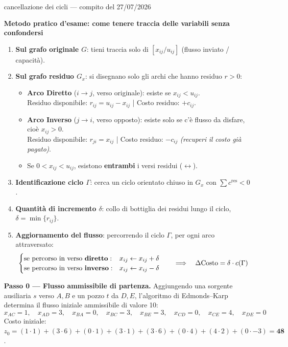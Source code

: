 \documentclass[11pt,a4paper]{article}
\begin{document}
\begin{es}{cancellazione dei cicli --- compito del 27/07/2026}
\begin{tcolorbox}[colback=lightbg,colframe=navy,arc=2pt,boxrule=0.8pt,left=6pt,right=6pt,top=5pt,bottom=5pt]
\textbf{Metodo pratico d'esame: come tenere traccia delle variabili senza confondersi}
\begin{enumerate}[leftmargin=1.2em,itemsep=0.2em]
\item \textbf{Sul grafo originale $G$}: tieni traccia solo di $[x_{ij} / u_{ij}]$ (flusso inviato / capacità).
\item \textbf{Sul grafo residuo $G_x$}: si disegnano solo gli archi che hanno residuo $r > 0$:
  \begin{itemize}[leftmargin=1.1em,itemsep=0.1em]
    \item \textbf{Arco Diretto} ($i \to j$, verso originale): esiste se $x_{ij} < u_{ij}$.\\
          Residuo disponibile: $r_{ij} = u_{ij} - x_{ij}$ \quad | \quad Costo residuo: $+c_{ij}$.
    \item \textbf{Arco Inverso} ($j \to i$, verso opposto): esiste solo se c'è flusso da disfare, cioè $x_{ij} > 0$.\\
          Residuo disponibile: $r_{ji} = x_{ij}$ \quad | \quad Costo residuo: $-c_{ij}$ \emph{(recuperi il costo già pagato)}.
    \item Se $0 < x_{ij} < u_{ij}$, esistono \textbf{entrambi} i versi residui ($\leftrightarrow$).
  \end{itemize}
\item \textbf{Identificazione ciclo $\Gamma$}: cerca un ciclo orientato chiuso in $G_x$ con $\sum c^{\text{res}} < 0$.
\item \textbf{Quantità di incremento $\delta$}: collo di bottiglia dei residui lungo il ciclo, $\delta = \min \{r_{ij}\}$.
\item \textbf{Aggiornamento del flusso}: percorrendo il ciclo $\Gamma$, per ogni arco attraversato:
  \[
  \begin{cases}
  \text{se percorso in verso \textbf{diretto}}: & x_{ij} \leftarrow x_{ij} + \delta\\
  \text{se percorso in verso \textbf{inverso}}: & x_{ij} \leftarrow x_{ij} - \delta
  \end{cases}
  \qquad\Longrightarrow\quad \Delta \text{Costo} = \delta \cdot c(\Gamma)
  \]
\end{enumerate}
\end{tcolorbox}

\textbf{Passo 0 --- Flusso ammissibile di partenza.}
Aggiungendo una sorgente ausiliaria $s$ verso $A, B$ e un pozzo $t$ da $D, E$, l'algoritmo di Edmonds--Karp determina il flusso iniziale ammissibile di valore 10:
\[
x_{AC}=1,\quad x_{AD}=3,\quad x_{BA}=0,\quad x_{BC}=3,\quad x_{BE}=3,\quad x_{CD}=0,\quad x_{CE}=4,\quad x_{DE}=0
\]
Costo iniziale: $z_0 = (1\cdot 1) + (3\cdot 6) + (0\cdot 1) + (3\cdot 1) + (3\cdot 6) + (0\cdot 4) + (4\cdot 2) + (0\cdot -3) = \mathbf{48}$.


\end{es}
\end{document}

